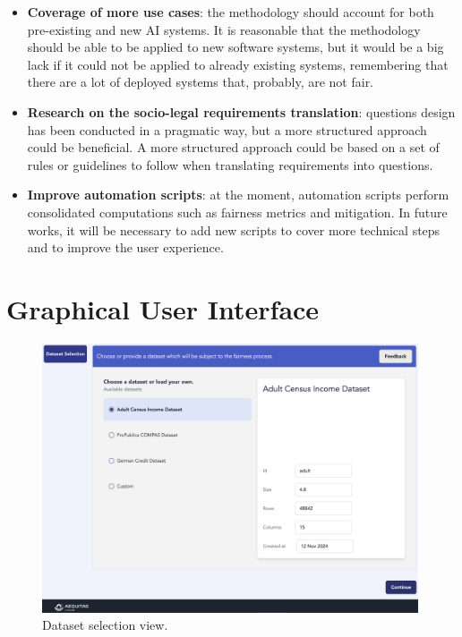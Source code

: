 \documentclass[12pt,a4paper,openright,twoside]{book}
\begin{document}
\begin{itemize}
    \item \textbf{Coverage of more use cases}: the methodology should account for both pre-existing and new \ac{AI} systems.
    It is reasonable that the methodology should be able to be applied to new software systems, but it would be a big lack if it could not be applied to already existing systems, remembering that there are a lot of deployed systems that, probably, are not fair.

    \item \textbf{Research on the socio-legal requirements translation}: questions design has been conducted in a pragmatic way, but a more structured approach could be beneficial.
    A more structured approach could be based on a set of rules or guidelines to follow when translating requirements into questions.

    \item \textbf{Improve automation scripts}: at the moment, automation scripts perform consolidated computations such as fairness metrics and mitigation.
    In future works, it will be necessary to add new scripts to cover more technical steps and to improve the user experience.
\end{itemize}


\appendix


\chapter{Graphical User Interface}\label{app:gui}


\begin{figure}
    \centering
    \includegraphics[width=0.99\textwidth]{figures/gui/dataset-selection.png}
    \caption{Dataset selection view.}
    \label{fig:dataset-selection}
\end{figure}
\end{document}
